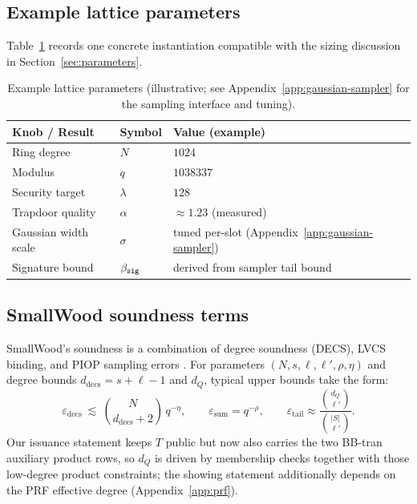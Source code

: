 \subsection{Example lattice parameters}
Table~\ref{tab:lattice-params} records one concrete instantiation compatible with the sizing discussion in
Section~\ref{sec:parameters}.

\begin{table}[H]
\centering
\renewcommand{\arraystretch}{1.15}
\begin{tabular}{@{}lll@{}}
\toprule
\textbf{Knob / Result} & \textbf{Symbol} & \textbf{Value (example)} \\
\midrule
Ring degree & \(N\) & \(1024\) \\
Modulus & \(q\) & \(1038337\) \\
Security target & \(\lambda\) & \(128\) \\
\midrule
Trapdoor quality & \(\alpha\) & \(\approx 1.23\) (measured) \\
Gaussian width scale & \(\sigma\) & tuned per-slot (Appendix~\ref{app:gaussian-sampler}) \\
Signature bound & \(\beta_{\mathtt{sig}}\) & derived from sampler tail bound \\
\bottomrule
\end{tabular}
\caption{Example lattice parameters (illustrative; see Appendix~\ref{app:gaussian-sampler} for the sampling interface and
tuning).}
\label{tab:lattice-params}
\end{table}

\subsection{SmallWood soundness terms}
SmallWood’s soundness is a combination of degree soundness (DECS), LVCS binding, and PIOP sampling errors
\cite{EPRINT:FenRiv25b}. For parameters \((N,s,\ell,\ell',\rho,\eta)\) and degree bounds \(d_{\mathrm{decs}}=s+\ell-1\)
and \(d_Q\), typical upper bounds take the form:
\[
\varepsilon_{\mathrm{decs}}\ \lesssim\ \binom{N}{d_{\mathrm{decs}}+2}\,q^{-\eta},
\qquad
\varepsilon_{\mathrm{sum}} = q^{-\rho},
\qquad
\varepsilon_{\mathrm{tail}} \approx \frac{\binom{d_Q}{\ell'}}{\binom{|S|}{\ell'}}.
\]
Our issuance statement keeps \(T\) public but now also carries the two BB-tran
auxiliary product rows, so \(d_Q\) is driven by membership checks together with
those low-degree product constraints; the showing statement additionally
depends on the PRF effective degree (Appendix~\ref{app:prf}).

